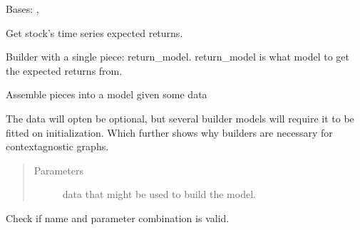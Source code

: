 \documentclass[letterpaper,10pt,english]{sphinxmanual}
\begin{document}
\begin{fulllineitems}
\label{\detokenize{dalio.pipe:dalio.pipe.builders.ExpectedReturns}}
Bases: {\hyperref[\detokenize{dalio.pipe:dalio.pipe.pipe.Pipe}]{}}, 

Get stock’s time series expected returns.

Builder with a single piece: return\_model. return\_model is what model to
get the expected returns from.

\begin{fulllineitems}
\label{\detokenize{dalio.pipe:dalio.pipe.builders.ExpectedReturns.build_model}}
Assemble pieces into a model given some data

The data will opten be optional, but several builder models will
require it to be fitted on initialization. Which further shows why
builders are necessary for context\sphinxhyphen{}agnostic graphs.
\begin{quote}\begin{description}
\item[{Parameters}] \leavevmode
{} \textendash{} data that might be used to build the model.

\end{description}\end{quote}

\end{fulllineitems}


\begin{fulllineitems}
\label{\detokenize{dalio.pipe:dalio.pipe.builders.ExpectedReturns.check_name}}
Check if name and parameter combination is valid.


\end{fulllineitems}
\end{fulllineitems}
\end{document}
